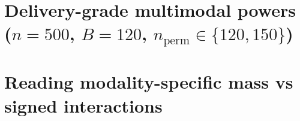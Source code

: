 \documentclass{article}
\begin{document}
\section{Delivery-grade multimodal powers ($n=500$, $B=120$, $n_{\mathrm{perm}}\in\{120,150\}$)}

\section{Reading modality-specific mass vs signed interactions}

\end{document}
